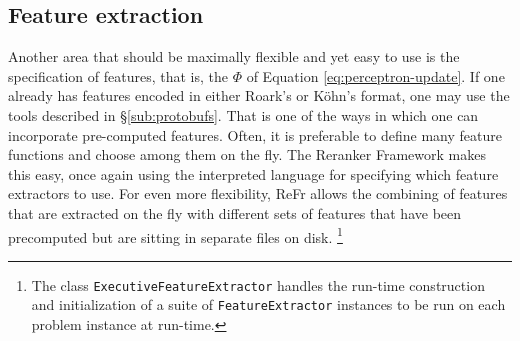 \documentclass[a4paper]{article}
\let\textquotedbl="
\newenvironment{lyxcode}
{\par\begin{list}{}{
\scriptsize
\setlength{\leftmargin}{0.1in}
\setlength{\rightmargin}{\leftmargin}
\setlength{\listparindent}{0pt}%
\raggedright
\setlength{\itemsep}{0pt}
\setlength{\parsep}{0pt}
\normalfont\ttfamily}%
 \item[]}
{\end{list}}
\begin{document}


\subsection{Feature extraction}

Another area that should be maximally flexible and yet easy to use
is the specification of features, that is, the $\Phi$ of Equation
\ref{eq:perceptron-update}. If one already has features encoded in
either Roark's or K\"{o}hn's format, one may use the tools described in
\S\ref{sub:protobufs}. That is one of the ways in which one can
incorporate pre-computed features. Often, it is preferable to define
many feature functions and choose among them on the fly. The Reranker
Framework makes this easy, once again using the interpreted language
for specifying which feature extractors to use.
For even more flexibility, ReFr allows the combining of features that
are extracted on the fly with different sets of features that have
been precomputed but are sitting in separate files on disk.%
\footnote{The class \texttt{ExecutiveFeatureExtractor} handles the run-time
construction and initialization of a suite of \texttt{FeatureExtractor}\emph{
}instances to be run on each problem instance at run-time.}
\end{document}
